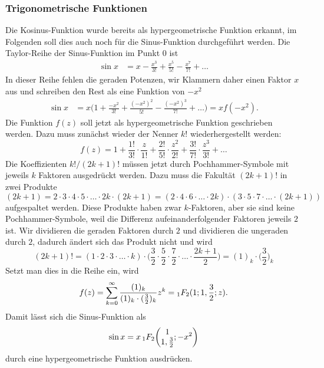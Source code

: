\subsubsection{Trigonometrische Funktionen}
Die Kosinus-Funktion wurde bereits als hypergeometrische Funktion erkannt,
im Folgenden soll dies auch noch für die Sinus-Funktion
durchgeführt werden.
Die Taylor-Reihe der Sinus-Funktion im Punkt $0$ ist
\begin{align*}
\sin x
&=
x-\frac{x^3}{3!}+\frac{x^5}{5!}-\frac{x^7}{7!}+\dots
\end{align*}
In dieser Reihe fehlen die geraden Potenzen, wir Klammern daher einen
Faktor $x$ aus und schreiben den Rest als eine Funktion von $-x^2$
\begin{align*}
\sin x
&=
x
\biggl(
1+\frac{-x^2}{3!}+\frac{(-x^2)^2}{5!}-\frac{(-x^2)^3}{7!}+\dots
\biggr)
=
x f(-x^2).
\end{align*}
Die Funktion $f(z)$ soll jetzt als hypergeometrische Funktion geschrieben
werden.
Dazu muss zunächst wieder der Nenner $k!$ wiederhergestellt werden:
\[
f(z)
=
1
+
\frac{1!}{3!}\cdot \frac{z}{1!}
+
\frac{2!}{5!}\cdot \frac{z^2}{2!}
+
\frac{3!}{7!}\cdot \frac{z^3}{3!}
+
\dots
\]
Die Koeffizienten $k!/(2k+1)!$ müssen jetzt durch Pochhammer-Symbole
mit jeweils $k$ Faktoren ausgedrückt werden.
Dazu muss die Fakultät $(2k+1)!$ in zwei Produkte
\[
(2k+1)
=
2\cdot 3 \cdot 4\cdot 5\cdot \ldots \cdot 2k \cdot (2k+1)
=
(2\cdot 4 \cdot 6\cdot\ldots\cdot 2k)
\cdot
(3\cdot 5\cdot 7\cdot \ldots \cdot (2k+1))
\]
aufgespaltet werden.
Diese Produkte haben zwar $k$-Faktoren, aber sie sind keine
Pochhammer-Symbole, weil die Differenz aufeinanderfolgender Faktoren 
jeweils $2$ ist.
Wir dividieren die geraden Faktoren durch $2$ und dividieren die 
ungeraden durch $2$, dadurch ändert sich das Produkt nicht und wird
\[
(2k+1)!
=
(1\cdot2\cdot3\cdot\ldots\cdot k)
\cdot
\biggl(
\frac{3}{2}\cdot
\frac{5}{2}\cdot
\frac{7}{2}\cdot
\ldots\cdot
\frac{2k+1}{2}
\biggr)
=
(1)_k\cdot \biggl(\frac{3}{2}\biggr)_k
\]
Setzt man dies in die Reihe ein, wird
\[
f(z)
=
\sum_{k=0}^\infty
\frac{(1)_k}{(1)_k\cdot (\frac{3}{2})_k}
z^k
=
\mathstrut_1F_2(1;1,\frac{3}{2};z).
\]
Damit lässt sich die Sinus-Funktion als
\[
\sin x
=
x\,\mathstrut_1F_2\biggl(\begin{matrix}1\\1,\frac32\end{matrix};-x^2\biggr)
\]
durch eine hypergeometrische Funktion ausdrücken.

